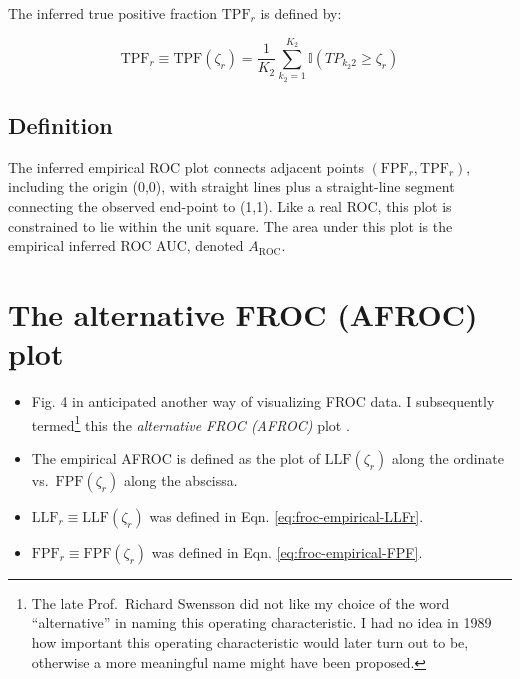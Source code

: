 \documentclass[
]{book}
\providecommand{\tightlist}{%
  \setlength{\itemsep}{0pt}\setlength{\parskip}{0pt}}
\begin{document}
The inferred true positive fraction \(\text{TPF}_r\) is defined by:

\begin{equation}
\text{TPF}_r \equiv \text{TPF}(\zeta_r) = \frac{1}{K_2}\sum_{k_2=1}^{K_2} \mathbb{I}\left ( TP_{k_2 2} \geq \zeta_r \right )
\label{eq:froc-empirical-TPF}
\end{equation}

\hypertarget{froc-empirical-definition-auc-ROC}{%
\subsection{Definition}\label{froc-empirical-definition-auc-ROC}}

The inferred empirical ROC plot connects adjacent points \(\left( \text{FPF}_r, \text{TPF}_r \right )\), including the origin (0,0), with straight lines plus a straight-line segment connecting the observed end-point to (1,1). Like a real ROC, this plot is constrained to lie within the unit square. The area under this plot is the empirical inferred ROC AUC, denoted \(A_{\text{ROC}}\).

\hypertarget{froc-empirical-AFROC}{%
\section{The alternative FROC (AFROC) plot}\label{froc-empirical-AFROC}}

\begin{itemize}
\tightlist
\item
  Fig. 4 in \citep{bunch1977free} anticipated another way of visualizing FROC data. I subsequently termed\footnote{The late Prof.~Richard Swensson did not like my choice of the word ``alternative'' in naming this operating characteristic. I had no idea in 1989 how important this operating characteristic would later turn out to be, otherwise a more meaningful name might have been proposed.} this the \emph{alternative FROC (AFROC)} plot \citep{chakraborty1989maximum}.
\item
  The empirical AFROC is defined as the plot of \(\text{LLF}(\zeta_r)\) along the ordinate vs.~\(\text{FPF}(\zeta_r)\) along the abscissa.
\item
  \(\text{LLF}_r \equiv \text{LLF}(\zeta_r)\) was defined in Eqn. \eqref{eq:froc-empirical-LLFr}.
\item
  \(\text{FPF}_r \equiv \text{FPF}(\zeta_r)\) was defined in Eqn. \eqref{eq:froc-empirical-FPF}.
\end{itemize}
\end{document}
